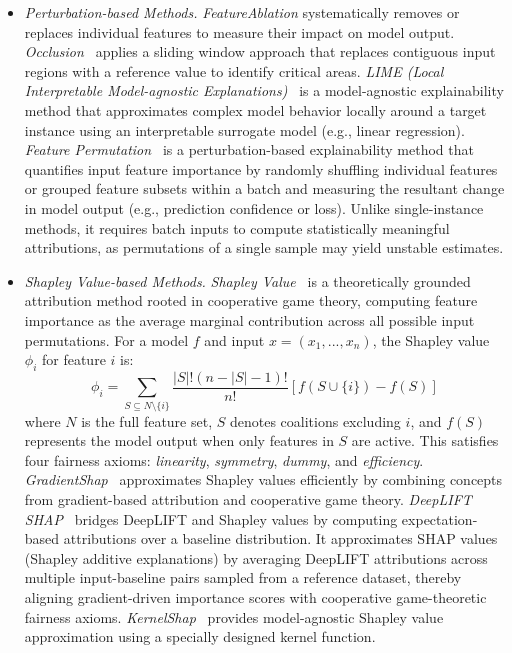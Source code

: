 \documentclass{article}
\begin{document}
\begin{itemize}[leftmargin=*]
    \item \textit{Perturbation-based Methods.} 
    \textit{FeatureAblation} systematically removes or replaces individual features to measure their impact on model output.
\textit{Occlusion~\cite{zeiler2013visualizingunderstandingconvolutionalnetworks}} applies a sliding window approach that replaces contiguous input regions with a reference value to identify critical areas.
\textit{LIME (Local Interpretable Model-agnostic Explanations)~\cite{ribeiro2016whyitrustyou}} is a model-agnostic explainability method that approximates complex model behavior locally around a target instance using an interpretable surrogate model (e.g., linear regression). 
\textit{Feature Permutation~\cite{altmann2010permutation}} is a perturbation-based explainability method that quantifies input feature importance by randomly shuffling individual features or grouped feature subsets within a batch and measuring the resultant change in model output (e.g., prediction confidence or loss). Unlike single-instance methods, it requires batch inputs to compute statistically meaningful attributions, as permutations of a single sample may yield unstable estimates. 

    \item \textit{Shapley Value-based Methods.} 
    \textit{Shapley Value~\cite{castro2009polynomial}} is a theoretically grounded attribution method rooted in cooperative game theory, computing feature importance as the average marginal contribution across all possible input permutations. For a model $f$ and input $x=(x_1,...,x_n)$, the Shapley value $\phi_i$ for feature $i$ is:  
$$\phi_i = \sum_{S \subseteq N \setminus \{i\}} \frac{|S|!(n-|S|-1)!}{n!} \left[ f(S \cup \{i\}) - f(S) \right]$$  
where $N$ is the full feature set, $S$ denotes coalitions excluding $i$, and $f(S)$ represents the model output when only features in $S$ are active. This satisfies four fairness axioms: \textit{linearity}, \textit{symmetry}, \textit{dummy}, and \textit{efficiency}.  
    \textit{GradientShap~\cite{lundberg2017unified}} approximates Shapley values efficiently by combining concepts from gradient-based attribution and cooperative game theory.
    \textit{DeepLIFT SHAP~\cite{lundberg2017unified}} bridges DeepLIFT and Shapley values by computing expectation-based attributions over a baseline distribution. It approximates SHAP values (Shapley additive explanations) by averaging DeepLIFT attributions across multiple input-baseline pairs sampled from a reference dataset, thereby aligning gradient-driven importance scores with cooperative game-theoretic fairness axioms.  
\textit{KernelShap~\cite{lundberg2017unified}} provides model-agnostic Shapley value approximation using a specially designed kernel function.
    
\end{itemize}
\end{document}
